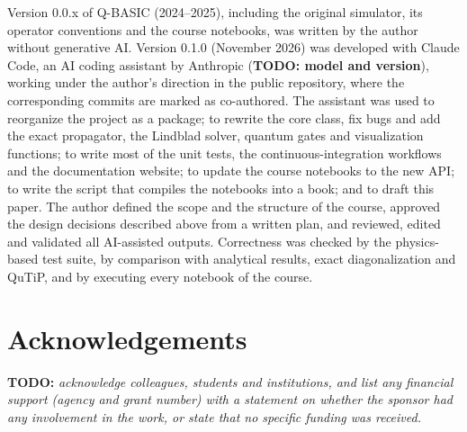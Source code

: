 \documentclass[
]{article}
\begin{document}
Version 0.0.x of Q-BASIC (2024--2025), including the original simulator,
its operator conventions and the course notebooks, was written by the
author without generative AI. Version 0.1.0 (November 2026) was
developed with Claude Code, an AI coding assistant by Anthropic
(\textbf{TODO: model and version}), working under the author's direction
in the public repository, where the corresponding commits are marked as
co-authored. The assistant was used to reorganize the project as a
package; to rewrite the core class, fix bugs and add the exact
propagator, the Lindblad solver, quantum gates and visualization
functions; to write most of the unit tests, the continuous-integration
workflows and the documentation website; to update the course notebooks
to the new API; to write the script that compiles the notebooks into a
book; and to draft this paper. The author defined the scope and the
structure of the course, approved the design decisions described above
from a written plan, and reviewed, edited and validated all AI-assisted
outputs. Correctness was checked by the physics-based test suite, by
comparison with analytical results, exact diagonalization and QuTiP, and
by executing every notebook of the course.

\section{Acknowledgements}\label{acknowledgements}

\textbf{TODO:} \emph{acknowledge colleagues, students and institutions,
and list any financial support (agency and grant number) with a
statement on whether the sponsor had any involvement in the work, or
state that no specific funding was received.}

\renewcommand\refname{References}

\end{document}

